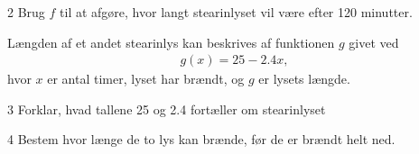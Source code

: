 \begin{delopgave}{}{2}
	Brug $f$ til at afgøre, hvor langt stearinlyset vil være efter 120 minutter. 
\end{delopgave}

\begin{meretekst}
	Længden af et andet stearinlys kan beskrives af funktionen $g$ givet ved
	\begin{align*}
		g(x) = 25-2.4x,
	\end{align*}
	hvor $x$ er antal timer, lyset har brændt, og $g$ er lysets længde. 
\end{meretekst}


\begin{delopgave}{}{3}
	Forklar, hvad tallene 25 og 2.4 fortæller om stearinlyset
\end{delopgave}

\begin{delopgave}{}{4}
	Bestem hvor længe de to lys kan brænde, før de er brændt helt ned. 
\end{delopgave}
